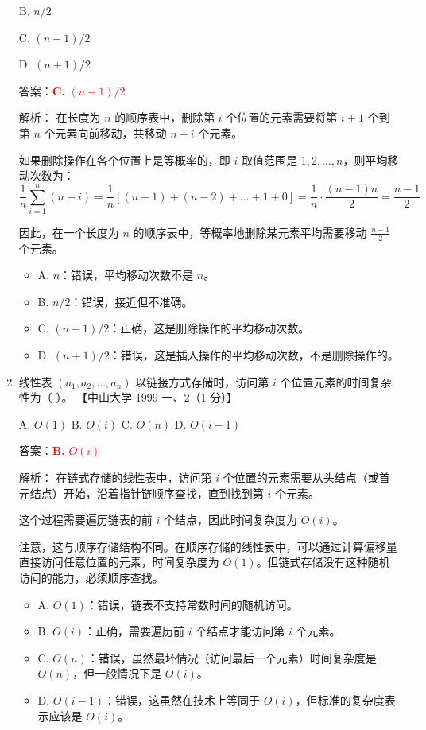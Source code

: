 \documentclass[lang=cn,newtx,10pt,scheme=chinese]{../../../elegantbook}
\begin{document}
\begin{enumerate}
        B. $n/2$  
    
        C. $(n-1)/2$  
    
        D. $(n+1)/2$ 

        答案：\textcolor{red}{\textbf{C.} $(n-1)/2$}

        解析：
        在长度为 $n$ 的顺序表中，删除第 $i$ 个位置的元素需要将第 $i+1$ 个到第 $n$ 个元素向前移动，共移动 $n-i$ 个元素。

        如果删除操作在各个位置上是等概率的，即 $i$ 取值范围是 $1,2,\ldots,n$，则平均移动次数为：
        $$\frac{1}{n}\sum_{i=1}^{n}(n-i) = \frac{1}{n}[(n-1) + (n-2) + ... + 1 + 0] = \frac{1}{n} \cdot \frac{(n-1)n}{2} = \frac{n-1}{2}$$

        因此，在一个长度为 $n$ 的顺序表中，等概率地删除某元素平均需要移动 $\frac{n-1}{2}$ 个元素。

        \begin{itemize}
            \item A. $n$：错误，平均移动次数不是 $n$。
            \item B. $n/2$：错误，接近但不准确。
            \item C. $(n-1)/2$：正确，这是删除操作的平均移动次数。
            \item D. $(n+1)/2$：错误，这是插入操作的平均移动次数，不是删除操作的。
        \end{itemize}
    
        \item 线性表 $(a_1, a_2, \dots, a_n)$ 以链接方式存储时，访问第 $i$ 个位置元素的时间复杂性为（ ）。  
        【中山大学 1999 一、2（1 分）】 
    
        A. $O(1)$ \quad B. $O(i)$ \quad C. $O(n)$ \quad D. $O(i-1)$  

        答案：\textcolor{red}{\textbf{B.} $O(i)$}

        解析：
        在链式存储的线性表中，访问第 $i$ 个位置的元素需要从头结点（或首元结点）开始，沿着指针链顺序查找，直到找到第 $i$ 个元素。

        这个过程需要遍历链表的前 $i$ 个结点，因此时间复杂度为 $O(i)$。

        注意，这与顺序存储结构不同。在顺序存储的线性表中，可以通过计算偏移量直接访问任意位置的元素，时间复杂度为 $O(1)$。但链式存储没有这种随机访问的能力，必须顺序查找。

        \begin{itemize}
            \item A. $O(1)$：错误，链表不支持常数时间的随机访问。
            \item B. $O(i)$：正确，需要遍历前 $i$ 个结点才能访问第 $i$ 个元素。
            \item C. $O(n)$：错误，虽然最坏情况（访问最后一个元素）时间复杂度是 $O(n)$，但一般情况下是 $O(i)$。
            \item D. $O(i-1)$：错误，这虽然在技术上等同于 $O(i)$，但标准的复杂度表示应该是 $O(i)$。
        \end{itemize}
    

\end{enumerate}
\end{document}
